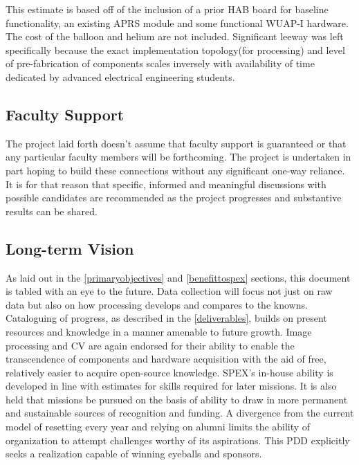 \documentclass[conference]{IEEEtran} %
\begin{document}

This estimate is based off of the inclusion of a prior HAB board for baseline functionality, an existing APRS module and some functional WUAP-I hardware. 
The cost of the balloon and helium are not included. Significant leeway was left specifically because the exact implementation topology(for processing) and level of pre-fabrication of components scales inversely with availability of time dedicated by advanced electrical engineering students.

\subsection{Faculty Support}
The project laid forth doesn't assume that faculty support is guaranteed or that any particular faculty members will be forthcoming. 
The project is undertaken in part hoping to build these connections without any significant one-way reliance. 
It is for that reason that specific, informed and meaningful discussions with possible candidates are recommended as the project progresses and substantive results can be shared.

\subsection{Long-term Vision}
As laid out in the \autoref{primaryobjectives} and \autoref{benefittospex} sections, this document is tabled with an eye to the future. Data collection will focus not just on raw data but also on how processing develops and compares to the knowns. 
Cataloguing of progress, as described in the \autoref{deliverables}, builds on present resources and knowledge in a manner amenable to future growth. 
Image processing and CV are again endorsed for their ability to enable the transcendence of components and hardware acquisition with the aid of free, relatively easier to acquire open-source knowledge. 
SPEX's in-house ability is developed in line with estimates for skills required for later missions. 
It is also held that missions be pursued on the basis of ability to draw in more permanent and sustainable sources of recognition and funding. 
A divergence from the current model of resetting every year and relying on alumni limits the ability of organization to attempt challenges worthy of its aspirations. 
This PDD explicitly seeks a realization capable of winning eyeballs and sponsors.
\end{document}
